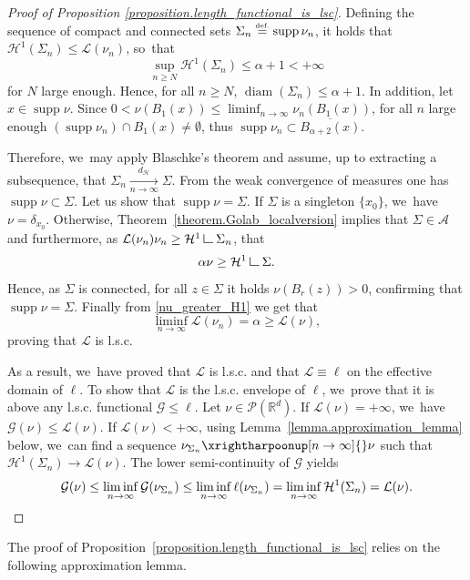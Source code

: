 \documentclass[JEP,XML,SOM,Unicode,NoFloatCountersInSection,published]{cedram}
\theoremstyle{definition}
\newcommand{\eqdef}{\ensuremath{\stackrel{\mbox{\upshape\tiny def.}}{=}}}
\newcommand\LM[1]{\hbox{\vrule width.5pt \vbox to#1pt{\vfill \hrule width#1pt height.5pt}}}
\newcommand\LL{{\mathchoice {\>\LM7\>}{\>\LM7\>}{\,\LM5\,}{\,\LM{3.35}\,}}}
\newcommand{\mres}{\LL}
\newcommand\G{\mathcal{G}}
\newcommand\cH{\mathcal{H}}
\newcommand{\RR}{\mathbb{R}}
\DeclareMathOperator{\diam}{diam}
\DeclareMathOperator{\supp}{supp}
\newcommand{\distH}{d_{\mathcal{H}}}
\begin{document}
\begin{proof}[Proof of Proposition \ref{proposition.length_functional_is_lsc}]
Defining the sequence of compact and connected sets $\Sigma_n \eqdef \supp \nu_n$, it holds that $\cH^1(\Sigma_n) \le \mathcal{L}(\nu_n)$, so~that
\[
\sup_{n\geq N} \cH^1(\Sigma_n) \leq \alpha +1 <+\infty
\]
for $N$ large enough. Hence, for all $n\ge N$, $\diam(\Sigma_n)\leq \alpha +1$. In addition, let $x\in \supp \nu$. Since $0<\nu(B_1(x))\leq \liminf_{n\to \infty}\nu_n(B_1(x))$, for all $n$ large enough $\left(\supp \nu_n\right)\cap B_1(x)\neq \emptyset$, thus $\supp \nu_n \subset \overline{B_{\alpha+2}(x)}$.

Therefore, we~may apply Blaschke's theorem and assume,
up to extracting a subsequence, that $\Sigma_n \xrightarrow[n \to \infty]{\distH} \Sigma$. From the weak convergence of measures one has $\supp \nu \subset \Sigma$. Let us show that $\supp \nu = \Sigma$. If $\Sigma$ is a singleton $\{x_0\}$, we~have $\nu = \delta_{x_0}$. Otherwise, Theorem~\ref{theorem.Golab_localversion} implies that $\Sigma \in \mathcal{A}$ and furthermore, as $\mathcal{L}(\nu_n) \nu_n \ge \cH^1\mres \Sigma_n$, that
\begin{equation}
\label{nu_greater_H1}
\alpha \nu \ge \cH^1\mres \Sigma.
\end{equation}
Hence, as $\Sigma$ is connected, for all $z \!\in\! \Sigma$ it holds $\nu(B_r(z)) \!>\! 0$, confirming that $\supp \nu \!=\! \Sigma$. Finally from \eqref{nu_greater_H1} we get that
\[
\liminf_{n \to \infty} \mathcal{L}(\nu_n)
=
\alpha
\ge
\mathcal{L}(\nu),
\]
proving that $\mathcal{L}$ is l.s.c.

As a result, we~have proved that $\mathcal{L}$ is l.s.c. and that $\mathcal{L}\equiv \ell$ on the effective domain of $\ell$. To show that $\mathcal{L}$ is the l.s.c. envelope of $\ell$, we~prove that it is above any l.s.c. functional $\G \le \ell$. Let $\nu \in \mathcal{P}(\RR^d)$. If $\mathcal{L}(\nu)=+\infty$, we~have $\G(\nu)\leq \mathcal{L}(\nu)$. If $\mathcal{L}(\nu)<+\infty$, using Lemma~\ref{lemma.approximation_lemma} below, we~can find a sequence $\nu_{\Sigma_n} \xrightharpoonup[n \to \infty]{} \nu$ such that $\cH^1(\Sigma_n) \rightarrow \mathcal{L}(\nu)$. The lower semi-continuity of $\G$ yields
\begin{equation*}
\G(\nu) \le \liminf_{n \to \infty} \G(\nu_{\Sigma_n })
\le \liminf_{n \to \infty} \ell(\nu_{\Sigma_n })
= \liminf_{n \to \infty} \cH^1(\Sigma_n)
= \mathcal{L}(\nu).\qedhere
\end{equation*}
\end{proof}

The proof of Proposition~\ref{proposition.length_functional_is_lsc} relies on the following approximation lemma.
\end{document}
